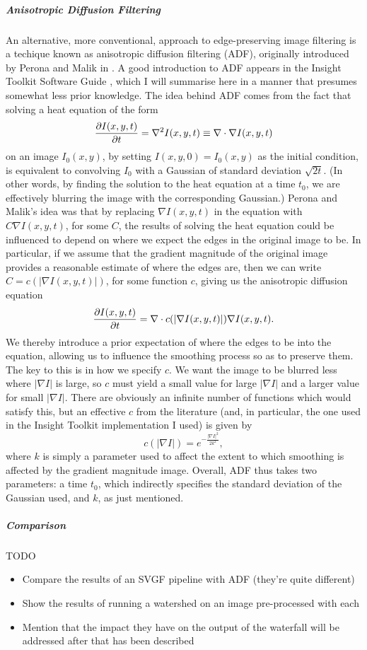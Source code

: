 \subparagraph{Anisotropic Diffusion Filtering}

An alternative, more conventional, approach to edge-preserving image filtering is a techique known as anisotropic diffusion filtering (ADF), originally introduced by Perona and Malik in \cite{perona90}. A good introduction to ADF appears in the Insight Toolkit Software Guide \cite{ITK}, which I will summarise here in a manner that presumes somewhat less prior knowledge. The idea behind ADF comes from the fact that solving a heat equation of the form
%
\[
\frac{\partial I(x,y,t)}{\partial t} = \nabla^2 I(x,y,t) \equiv \nabla \cdot \nabla I(x,y,t)
\]
%
on an image $I_0(x,y)$, by setting $I(x,y,0) = I_0(x,y)$ as the initial condition, is equivalent to convolving $I_0$ with a Gaussian of standard deviation $\sqrt{2t}$. (In other words, by finding the solution to the heat equation at a time $t_0$, we are effectively blurring the image with the corresponding Gaussian.) Perona and Malik's idea was that by replacing $\nabla I(x,y,t)$ in the equation with $C \nabla I(x,y,t)$, for some $C$, the results of solving the heat equation could be influenced to depend on where we expect the edges in the original image to be. In particular, if we assume that the gradient magnitude of the original image provides a reasonable estimate of where the edges are, then we can write $C = c(|\nabla I(x,y,t)|)$, for some function $c$, giving us the anisotropic diffusion equation
%
\[
\frac{\partial I(x,y,t)}{\partial t} = \nabla \cdot c(|\nabla I(x,y,t)|) \nabla I(x,y,t).
\]
%
We thereby introduce a prior expectation of where the edges to be into the equation, allowing us to influence the smoothing process so as to preserve them. The key to this is in how we specify $c$. We want the image to be blurred less where $|\nabla I|$ is large, so $c$ must yield a small value for large $|\nabla I|$ and a larger value for small $|\nabla I|$. There are obviously an infinite number of functions which would satisfy this, but an effective $c$ from the literature (and, in particular, the one used in the Insight Toolkit \cite{ITK} implementation I used) is given by
%
\[
c(|\nabla I|) = e^{-\frac{|\nabla I|^2}{2k^2}},
\]
%
where $k$ is simply a parameter used to affect the extent to which smoothing is affected by the gradient magnitude image. Overall, ADF thus takes two parameters: a time $t_0$, which indirectly specifies the standard deviation of the Gaussian used, and $k$, as just mentioned.

\subparagraph{Comparison}

TODO

\begin{itemize}
\item Compare the results of an SVGF pipeline with ADF (they're quite different)
\item Show the results of running a watershed on an image pre-processed with each
\item Mention that the impact they have on the output of the waterfall will be addressed after that has been described
\end{itemize}

